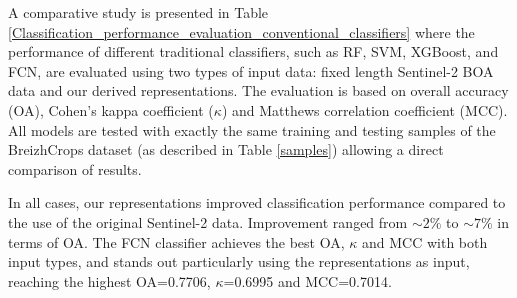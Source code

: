 \documentclass[journal,article,submit,pdftex,moreauthors]{Definitions/mdpi}
\begin{document}

A comparative study is presented in Table \ref{Classification_performance_evaluation_conventional_classifiers} where the performance of different traditional classifiers, such as RF, SVM, XGBoost, and FCN, are evaluated using two types of input data: fixed length Sentinel-2 BOA data and our derived representations. The evaluation is based on overall accuracy (OA), Cohen's kappa coefficient ($\kappa$) and Matthews correlation coefficient (MCC). All models are tested with exactly the same training and testing samples of the BreizhCrops dataset (as described in Table \ref{samples}) allowing a direct comparison of results. 

In all cases, our representations improved classification performance compared to the use of the original Sentinel-2 data.
Improvement ranged from $\sim 2\%$ to $\sim 7\%$ in terms of OA. The FCN classifier achieves the best OA, $\kappa$ and MCC with both input types, and stands out particularly using the representations as input, reaching the highest OA=0.7706, $\kappa$=0.6995 and MCC=0.7014.
\end{document}
